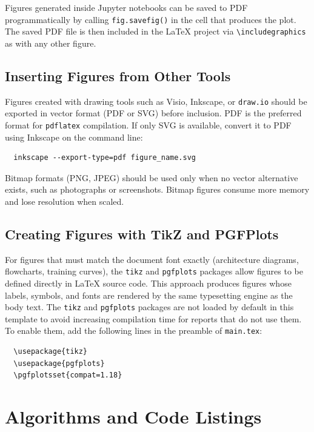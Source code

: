 \documentclass{iteso-irr}
\begin{document}
Figures generated inside Jupyter notebooks can be saved to PDF
programmatically by calling \texttt{fig.savefig()} in the cell that
produces the plot. The saved PDF file is then included in the \LaTeX{}
project via \verb|\includegraphics| as with any other figure.

\subsection{Inserting Figures from Other Tools}
\label{sec:other_figures}

Figures created with drawing tools such as Visio, Inkscape, or
\texttt{draw.io} should be exported in vector format (PDF or SVG)
before inclusion. PDF is the preferred format for \texttt{pdflatex}
compilation. If only SVG is available, convert it to PDF using
Inkscape on the command line:
%
\begin{verbatim}
  inkscape --export-type=pdf figure_name.svg
\end{verbatim}
%
Bitmap formats (PNG, JPEG) should be used only when no vector
alternative exists, such as photographs or screenshots. Bitmap
figures consume more memory and lose resolution when scaled.

\subsection{Creating Figures with TikZ and PGFPlots}
\label{sec:tikz_figures}

For figures that must match the document font exactly (architecture
diagrams, flowcharts, training curves), the \texttt{tikz} and
\texttt{pgfplots} packages allow figures to be defined directly in
\LaTeX{} source code. This approach produces figures whose labels,
symbols, and fonts are rendered by the same typesetting engine as the
body text. The \texttt{tikz} and \texttt{pgfplots} packages are not
loaded by default in this template to avoid increasing compilation time
for reports that do not use them. To enable them, add the following
lines in the preamble of \texttt{main.tex}:
%
\begin{lstlisting}
  \usepackage{tikz}
  \usepackage{pgfplots}
  \pgfplotsset{compat=1.18}
\end{lstlisting}


\section{Algorithms and Code Listings}
\label{sec:algorithms}
\end{document}
